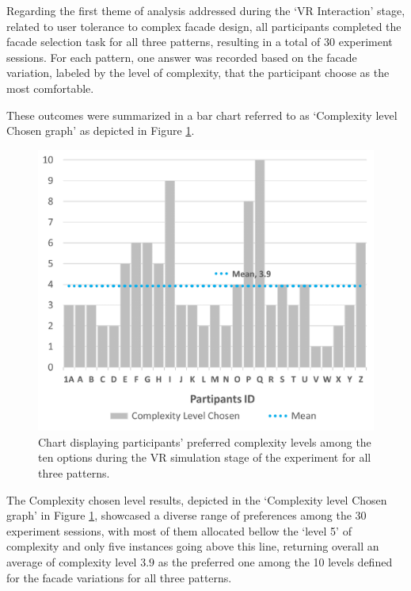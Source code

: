 Regarding the first theme of analysis addressed during the `VR Interaction' stage, related to user tolerance to complex facade design, all participants completed the facade selection task for all three patterns, resulting in a total of 30 experiment sessions.
For each pattern, one answer was recorded based on the facade variation, labeled by the level of complexity, that the participant choose as the most comfortable.

These outcomes were summarized in a bar chart referred to as `Complexity level Chosen graph' as depicted in Figure \ref{fig:ComplexityLevelChosenChart}.

    \begin{figure}[htb]
        \centering
        \includegraphics[width=\linewidth]{Images/ComplexityLevelChosenChart}
        \caption{Chart displaying participants' preferred complexity levels among the ten options during the VR simulation stage of the experiment for all three patterns.}
        \label{fig:ComplexityLevelChosenChart}
    \end{figure}

The Complexity chosen level results, depicted in the `Complexity level Chosen graph' in Figure \ref{fig:ComplexityLevelChosenChart}, showcased a diverse range of preferences among the 30 experiment sessions, with most of them allocated bellow the `level 5' of complexity and only five instances going above this line, returning overall an average of  complexity level \(3.9\) as the preferred one among the 10 levels defined for the facade variations for all three patterns.

